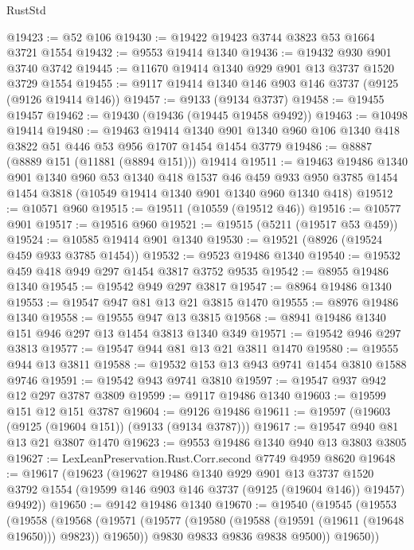 \begin{lexlean}{RustStd}
\begin{coremodule}
@19423 := @52 @106
@19430 := @19422 @19423 @3744 @3823 @53 @1664 @3721 @1554
@19432 := @9553 @19414 @1340
@19436 := @19432 @930 @901 @3740 @3742
@19445 := @11670 @19414 @1340 @929 @901 @13 @3737 @1520 @3729 @1554
@19455 := @9117 @19414 @1340 @146 @903 @146 @3737 (@9125 (@9126 @19414 @146))
@19457 := @9133 (@9134 @3737)
@19458 := @19455 @19457
@19462 := @19430 (@19436 (@19445 @19458 @9492))
@19463 := @10498 @19414
@19480 := @19463
    @19414
    @1340
    @901
    @1340
    @960
    @106
    @1340
    @418
    @3822
    @51
    @446
    @53
    @956
    @1707
    @1454
    @1454
    @3779
@19486 := @8887 (@8889 @151 (@11881 (@8894 @151))) @19414
@19511 := @19463
    @19486
    @1340
    @901
    @1340
    @960
    @53
    @1340
    @418
    @1537
    @46
    @459
    @933
    @950
    @3785
    @1454
    @1454
    @3818
    (@10549 @19414 @1340 @901 @1340 @960 @1340 @418)
@19512 := @10571 @960
@19515 := @19511 (@10559 (@19512 @46))
@19516 := @10577 @901
@19517 := @19516 @960
@19521 := @19515 (@5211 (@19517 @53 @459))
@19524 := @10585 @19414 @901 @1340
@19530 := @19521 (@8926 (@19524 @459 @933 @3785 @1454))
@19532 := @9523 @19486 @1340
@19540 := @19532 @459 @418 @949 @297 @1454 @3817 @3752 @9535
@19542 := @8955 @19486 @1340
@19545 := @19542 @949 @297 @3817
@19547 := @8964 @19486 @1340
@19553 := @19547 @947 @81 @13 @21 @3815 @1470
@19555 := @8976 @19486 @1340
@19558 := @19555 @947 @13 @3815
@19568 := @8941 @19486 @1340 @151 @946 @297 @13 @1454 @3813 @1340 @349
@19571 := @19542 @946 @297 @3813
@19577 := @19547 @944 @81 @13 @21 @3811 @1470
@19580 := @19555 @944 @13 @3811
@19588 := @19532 @153 @13 @943 @9741 @1454 @3810 @1588 @9746
@19591 := @19542 @943 @9741 @3810
@19597 := @19547 @937 @942 @12 @297 @3787 @3809
@19599 := @9117 @19486 @1340
@19603 := @19599 @151 @12 @151 @3787
@19604 := @9126 @19486
@19611 := @19597 (@19603 (@9125 (@19604 @151)) (@9133 (@9134 @3787)))
@19617 := @19547 @940 @81 @13 @21 @3807 @1470
@19623 := @9553 @19486 @1340 @940 @13 @3803 @3805
@19627 := LexLeanPreservation.Rust.Corr.second @7749 @4959 @8620
@19648 := @19617
    (@19623
      (@19627
        @19486
        @1340
        @929
        @901
        @13
        @3737
        @1520
        @3792
        @1554
        (@19599 @146 @903 @146 @3737 (@9125 (@19604 @146)) @19457)
        @9492))
@19650 := @9142 @19486 @1340
@19670 := @19540
    (@19545
      (@19553
        (@19558
          (@19568
            (@19571 (@19577 (@19580 (@19588 (@19591 (@19611 (@19648 @19650))) @9823)) @19650))
            @9830
            @9833
            @9836
            @9838
            @9500))
        @19650))

\end{coremodule}
\end{lexlean}

